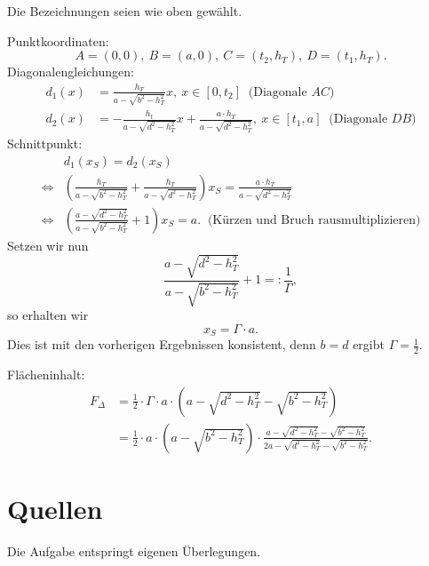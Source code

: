 \documentclass[]{scrartcl}
\begin{document}
\newpage

\noindent 
Die Bezeichnungen seien wie oben gewählt.

\noindent 
Punktkoordinaten:
$$
A = (0,0), ~ B = (a,0), ~ C = (t_2,h_T), ~ D = (t_1,h_T). 
$$
Diagonalengleichungen:
\begin{align*}
	d_1(x) &= \frac{h_T}{a-\sqrt{b^2-h_T^2}}x, ~ x \in [0,t_2] ~
	\text{ (Diagonale $AC$)}
	\\
	d_2(x) &= -\frac{h_t}{a-\sqrt{d^2-h_T^2}}x + \frac{a\cdot h_T}
	{a-\sqrt{d^2-h_T^2}}, ~ x \in [t_1,a] ~ \text{ (Diagonale $DB$)}
\end{align*}
Schnittpunkt:
\begin{align*}
	& d_1(x_S) = d_2(x_S)
	\\
	\Leftrightarrow & 
	\left ( 
		\frac{h_T}{a-\sqrt{b^2-h_T^2}} + 
		\frac{h_T}{a-\sqrt{d^2-h_T^2}}
	\right ) 
	x_S = \frac{a\cdot h_T}{a-\sqrt{d^2-h_T^2}}
	\\
	\Leftrightarrow & 
	\left ( 
		\frac{a-\sqrt{d^2-h_T^2}}{a-\sqrt{b^2-h_T^2}} + 1
	\right )
	x_S = a. ~ \text{ (Kürzen und Bruch rausmultiplizieren)}
\end{align*}
Setzen wir nun 
$$
	\frac{a-\sqrt{d^2-h_T^2}}{a-\sqrt{b^2-h_T^2}} + 1 =: \frac{1}{\Gamma},
$$
so erhalten wir 
$$
x_S = \Gamma \cdot a.
$$
Dies ist mit den vorherigen Ergebnissen konsistent, denn $b=d$ 
ergibt $\Gamma = \frac{1}{2}$. 

\noindent 
Flächeninhalt:
\begin{align*}
	F_\Delta 
	&=
	\frac{1}{2} \cdot \Gamma \cdot a \cdot 
	\left ( 
	a - \sqrt{d^2-h_T^2} - \sqrt{b^2-h_T^2}
	\right )
	\\ &=
	\frac{1}{2} \cdot a \cdot 
	\left (
		a-\sqrt{b^2-h_T^2}
	\right )
	\cdot 
	\frac
	{
		a - \sqrt{d^2-h_T^2} - \sqrt{b^2-h_T^2}
	}
	{
		2a - \sqrt{d^2-h_T^2} - \sqrt{b^2-h_T^2}
	}.
\end{align*}


\section*{Quellen}
Die Aufgabe entspringt eigenen Überlegungen.
\end{document}
